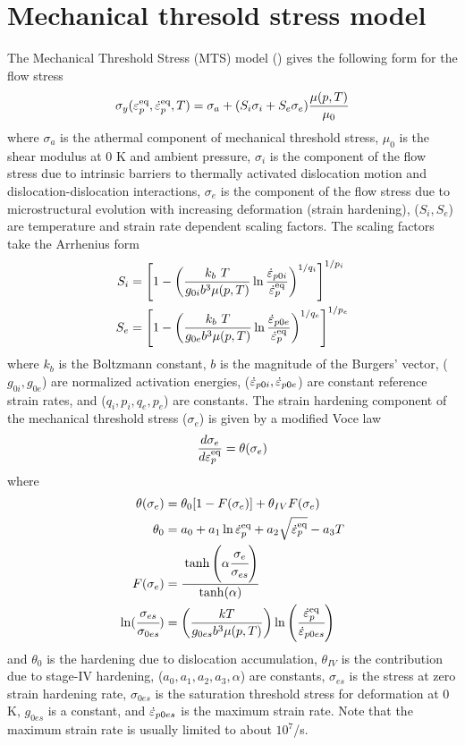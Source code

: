 \section{Mechanical thresold stress model}
The Mechanical Threshold Stress (MTS) model 
(\cite{Follans1988,Goto2000a,Kocks2001})  
gives the following form for the flow stress
\begin{equation}
  \sigma_y(\varepsilon_p^\text{eq},\dot{\varepsilon}_{p}^\text{eq},T) = 
    \sigma_a + (S_i \sigma_i + S_e \sigma_e)\frac{\mu(p,T)}{\mu_0} 
\end{equation}
where $\sigma_a$ is the athermal component of mechanical threshold stress,
$\mu_0$ is the shear modulus at 0 K and ambient pressure, 
$\sigma_i$ is the component of the flow stress due to intrinsic barriers 
to thermally activated dislocation motion and dislocation-dislocation 
interactions, $\sigma_e$ is the component of the flow stress due to 
microstructural evolution with increasing deformation (strain hardening), 
($S_i, S_e$) are temperature and strain rate dependent scaling factors.  The
scaling factors take the Arrhenius form
\begin{align}
  S_i & = \left[1 - \left(\frac{k_b~T}{g_{0i}b^3\mu(p,T)}
  \ln\frac{\dot{\varepsilon}_{p0i}}{\dot{\varepsilon}_{p}^\text{eq}}\right)^{1/q_i}
  \right]^{1/p_i} \\
  S_e & = \left[1 - \left(\frac{k_b~T}{g_{0e}b^3\mu(p,T)}
  \ln\frac{\dot{\varepsilon}_{p0e}}{\dot{\varepsilon}_{p}^\text{eq}}\right)^{1/q_e}
  \right]^{1/p_e}
\end{align}
where $k_b$ is the Boltzmann constant, $b$ is the magnitude of the Burgers' 
vector, ($g_{0i}, g_{0e}$) are normalized activation energies, 
($\dot{\varepsilon}_{p0i}, \dot{\varepsilon}_{p0e}$) are constant reference strain rates, and
($q_i, p_i, q_e, p_e$) are constants.  The strain hardening component
of the mechanical threshold stress ($\sigma_e$) is given by a
modified Voce law
\begin{equation}\label{eq:MTSsige}
  \frac{d\sigma_e}{d\varepsilon_p^\text{eq}} = \theta(\sigma_e)
\end{equation}
where
\begin{align}
  \theta(\sigma_e) & = 
     \theta_0 [ 1 - F(\sigma_e)] + \theta_{IV} F(\sigma_e) \\
  \theta_0 & = a_0 + a_1 \ln \dot{\varepsilon}_{p}^\text{eq} + a_2 \sqrt{\dot{\varepsilon}_{p}^\text{eq}} - a_3 T \\
  F(\sigma_e) & = 
    \cfrac{\tanh\left(\alpha \cfrac{\sigma_e}{\sigma_{es}}\right)}
    {\tanh(\alpha)}\\
  \ln(\cfrac{\sigma_{es}}{\sigma_{0es}}) & =
  \left(\frac{kT}{g_{0es} b^3 \mu(p,T)}\right)
  \ln\left(\cfrac{\dot{\varepsilon}_{p}^\text{eq}}{\dot{\varepsilon}_{p0es}}\right)
\end{align}
and $\theta_0$ is the hardening due to dislocation accumulation, 
$\theta_{IV}$ is the contribution due to stage-IV hardening,
($a_0, a_1, a_2, a_3, \alpha$) are constants,
$\sigma_{es}$ is the stress at zero strain hardening rate, 
$\sigma_{0es}$ is the saturation threshold stress for deformation at 0 K,
$g_{0es}$ is a constant, and $\dot{\varepsilon}_{p0es}$ is the maximum strain rate.  Note
that the maximum strain rate is usually limited to about $10^7$/s.

